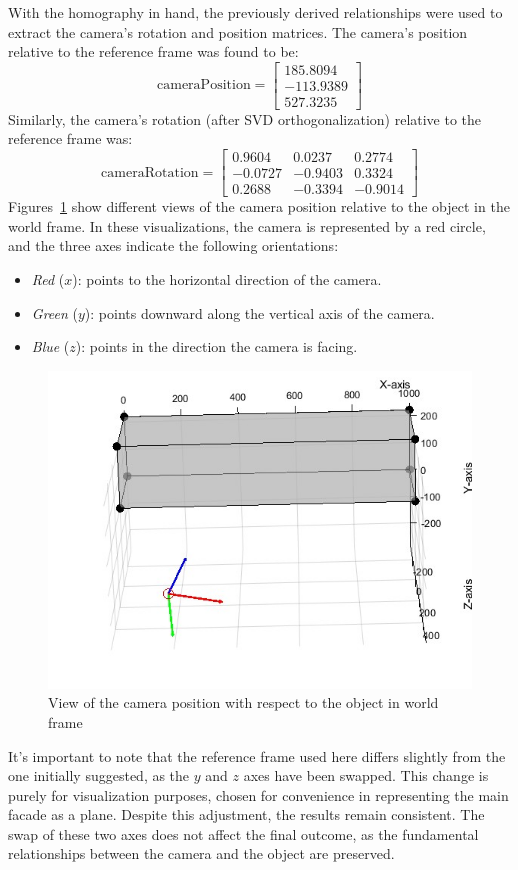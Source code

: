 \documentclass{Academic}
\begin{document}
With the homography in hand, the previously derived relationships were used to extract the camera's rotation and position matrices. 
The camera's position relative to the reference frame was found to be:
\begin{equation}\text{cameraPosition}=\begin{bmatrix}
    185.8094 \\ -113.9389 \\ 527.3235
\end{bmatrix}\end{equation}
Similarly, the camera's rotation (after SVD orthogonalization) relative to the reference frame was:
\begin{equation} \text{cameraRotation}=\begin{bmatrix} 
    0.9604 & 0.0237 & 0.2774 \\
    -0.0727 & -0.9403 & 0.3324 \\
    0.2688 & -0.3394 & -0.9014
\end{bmatrix}\end{equation}
Figures~\ref{fig:views} show different views of the camera position relative to the object in the world frame. 
In these visualizations, the camera is represented by a red circle, and the three axes indicate the following orientations: \begin{itemize} 
    \item \textit{Red} ($x$): points to the horizontal direction of the camera. 
    \item \textit{Green} ($y$): points downward along the vertical axis of the camera. 
    \item \textit{Blue} ($z$): points in the direction the camera is facing. 
\end{itemize}
\begin{figure}[!htb]
    \centering
    \includegraphics[width=0.5\linewidth]{images/pers.jpg}
    \caption{View of the camera position with respect to the object in world frame}
    \label{fig:views}
\end{figure}
\noindent It’s important to note that the reference frame used here differs slightly from the one initially suggested, as the $y$ and $z$ axes have been swapped. 
This change is purely for visualization purposes, chosen for convenience in representing the main facade as a plane. 
Despite this adjustment, the results remain consistent. 
The swap of these two axes does not affect the final outcome, as the fundamental relationships between the camera and the object are preserved.
\end{document}

